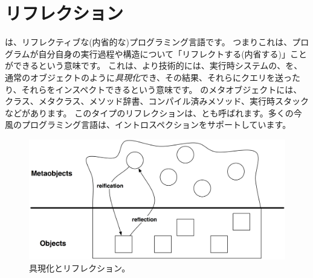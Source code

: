 \documentclass[a4paper,10pt,twoside]{book}
\begin{document}
	\renewcommand{\nnbb}[2]{} %
	\sloppy
\fi

\chapter{リフレクション}


\st{}は、リフレクティブな(内省的な)プログラミング言語です。
つまりこれは、プログラムが自分自身の実行過程や構造について「リフレクトする(内省する)」ことができるという意味です。
これは、より技術的には、実行時システムの、を、通常のオブジェクトのように\emph{具現化}でき、その結果、それらにクエリを送ったり、それらをインスペクトできるという意味です。
\st{}のメタオブジェクトには、クラス、メタクラス、メソッド辞書、コンパイル済みメソッド、実行時スタックなどがあります。
このタイプのリフレクションは、とも呼ばれます。多くの今風のプログラミング言語は、イントロスペクションをサポートしています。

\begin{figure}[ht]\centering
	\includegraphics[width=\linewidth]{reflect}
	\caption{具現化とリフレクション。} %
\end{figure}
\end{document}
